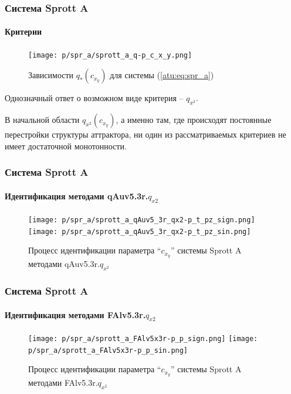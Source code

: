 \documentclass[10pt,utf8]{beamer}
\begin{document}

\begin{frame}
  \frametitle{Система Sprott A}
  \framesubtitle{Критерии}


  \begin{figure}[htb!]
  \centerline{
    \texttt{[image: p/spr\_a/sprott\_a\_q-p\_c\_x\_y.png]}
  }
  \caption{Зависимости $q_{*}(c_{x_y})$ для системы (\ref{atu:eq:spr_a}) }
  \label{atu:f:spr_a_q}
  \end{figure}

  \vspace{-4ex}
  Однозначный ответ о возможном виде критерия -- $q_{x^2}$.

  В начальной области
  $q_{x^2}(c_{x_y}) $, а именно там, где происходят постоянные
  перестройки структуры аттрактора, ни один из рассматриваемых критериев
  не имеет достаточной монотонности.
\end{frame}




\begin{frame}
  \frametitle{Система Sprott A}
  \framesubtitle{Идентификация методами qAuv5.3r.$q_{x2}$}


\begin{figure}[h!]
  \centerline{
    \texttt{[image: p/spr\_a/sprott\_a\_qAuv5\_3r\_qx2-p\_t\_pz\_sign.png]}
    \hfill
    \texttt{[image: p/spr\_a/sprott\_a\_qAuv5\_3r\_qx2-p\_t\_pz\_sin.png]}
  }
  \caption{Процесс идентификации параметра ``$c_{x_y}$'' системы Sprott A методами qAuv5.3r.$q_{x^2}$}
  \label{atu:f:spr_a_id_qAuv5.3r.q_x2_sign}
\end{figure}

\end{frame}



\begin{frame}
  \frametitle{Система Sprott A}
  \framesubtitle{Идентификация методами FAlv5.3r.$q_{x2}$}


\begin{figure}[h!]
  \centerline{
    \texttt{[image: p/spr\_a/sprott\_a\_FAlv5x3r-p\_p\_sign.png]}
    \hfill
    \texttt{[image: p/spr\_a/sprott\_a\_FAlv5x3r-p\_p\_sin.png]}
  }
  \caption{Процесс идентификации параметра ``$c_{x_y}$'' системы Sprott A методами FAlv5.3r.$q_{x^2}$}
  \label{atu:f:spr_a_id_FAlv5.3r.q_x2_sign}
\end{figure}

\end{frame}
\end{document}
